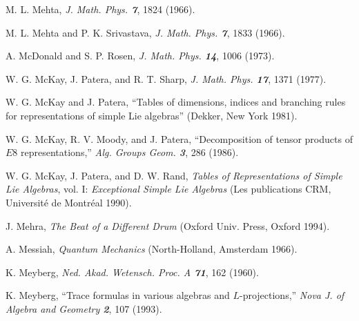  M. L. Mehta,
{\em J. Math. Phys.  \bf 7}, 1824 (1966).

 M. L. Mehta and P. K. Srivastava,
{\em J. Math. Phys.  \bf 7}, 1833 (1966).

 A. McDonald and S. P. Rosen,
{\em J. Math. Phys.  \bf 14}, 1006 (1973).

 W. G. McKay, J. Patera, and R. T. Sharp,
{\em J. Math. Phys.  \bf 17}, 1371 (1977).

 W. G. McKay and J. Patera,
    ``Tables of dimensions, indices and branching rules for representations of
      simple Lie algebras''
    (Dekker, New York 1981).

 W. G. McKay, R. V. Moody, and J. Patera,
``Decomposition of tensor products of $E8$ representations,''
{\em Alg. Groups Geom. \bf 3}, 286 (1986).

 W. G. McKay, J. Patera, and D. W. Rand,
{\em Tables of Representations of Simple Lie Algebras}, vol.{ I}:
{\em Exceptional Simple Lie Algebras}
(Les publications CRM, Universit{\'e} de Montr{\'e}al 1990).

 J. Mehra,
    {\em The Beat of a Different Drum}
    (Oxford Univ. Press, Oxford 1994).

 A. Messiah,
    {\em Quantum Mechanics}
    (North-Holland, Amsterdam 1966).


 K. Meyberg,
{\em Ned. Akad. Wetensch. Proc.  A \bf 71}, 162 (1960).


 K. Meyberg,
    ``Trace formulas in various algebras and $L$-projections,''
    {\em Nova J. of Algebra and Geometry \bf 2}, 107 (1993). %

